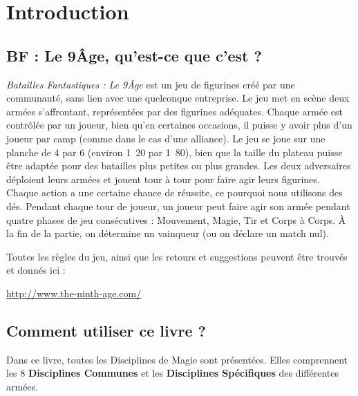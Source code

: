 \documentclass[a4paper,8pt]{extarticle}
\newcommand{\pied}{\arcminute}
\begin{document}


\newpage

{
\Large
\tableofcontents
}
\newpage

{\large
\section{Introduction}

\subsection{BF : Le 9\ieme Âge, qu'est-ce que c'est ?}

\emph{Batailles Fantastiques : Le 9\ieme Âge} est un jeu de figurines créé par une communauté, sans lien avec une quelconque entreprise. Le jeu met en scène deux armées s'affrontant, représentées par des figurines adéquates. Chaque armée est contrôlée par un joueur, bien qu'en certaines occasions, il puisse y avoir plus d'un joueur par camp (comme dans le cas d'une alliance). Le jeu se joue sur une planche de \unit{4}{\pied} par \unit{6}{\pied} (environ \unit{1.20}{\meter} par \unit{1.80}{\meter}), bien que la taille du plateau puisse être adaptée pour des batailles plus petites ou plus grandes. Les deux adversaires déploient leurs armées et jouent tour à tour pour faire agir leurs figurines. Chaque action a une certaine chance de réussite, ce pourquoi nous utilisons des dés. Pendant chaque tour de joueur, un joueur peut faire agir son armée pendant quatre phases de jeu consécutives : Mouvement, Magie, Tir et Corps à Corps. À la fin de la partie, on détermine un vainqueur (ou on déclare un match nul).

Toutes les règles du jeu, ainsi que les retours et suggestions peuvent être trouvés et donnés ici :
\begin{center}
\url{http://www.the-ninth-age.com/}
\end{center}

\subsection{Comment utiliser ce livre ?}

Dans ce livre, toutes les Disciplines de Magie sont présentées. Elles comprennent les 8 \textbf{Disciplines Communes} et les \textbf{Disciplines Spécifiques} des différentes armées.

}
\end{document}
